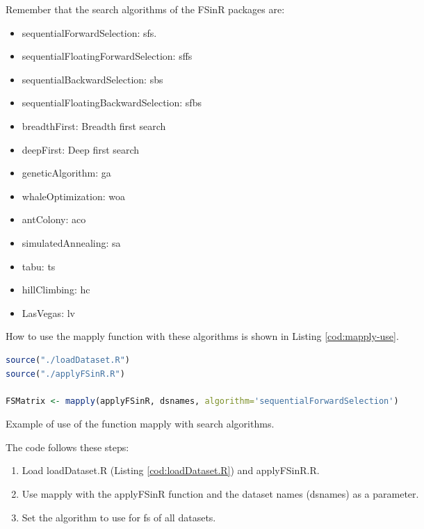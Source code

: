 Remember that the search algorithms of the FSinR packages are:
\begin{itemize}
    \item sequentialForwardSelection: \acrfull{sfs}.
    \item sequentialFloatingForwardSelection: \acrfull{sffs}
    \item sequentialBackwardSelection: \acrfull{sbs}
    \item sequentialFloatingBackwardSelection: \acrfull{sfbs}
    \item breadthFirst: Breadth first search
    \item deepFirst: Deep first search
    \item geneticAlgorithm: \acrfull{ga}
    \item whaleOptimization: \acrfull{woa}
    \item antColony: \acrfull{aco}
    \item simulatedAnnealing: \acrfull{sa}
    \item tabu: \acrfull{ts}
    \item hillClimbing: \acrfull{hc}
    \item LasVegas: \acrfull{lv}
\end{itemize}

How to use the mapply function with these algorithms is shown in Listing \ref{cod:mapply-use}.

\begin{codefloat}[H]
\begin{lstlisting}[language=R, style=Ccolor]
source("./loadDataset.R")
source("./applyFSinR.R")

FSMatrix <- mapply(applyFSinR, dsnames, algorithm='sequentialForwardSelection')
\end{lstlisting}
\caption{Example of use of the function mapply with search algorithms.}
\label{cod:mapply-use}
\end{codefloat}

The code follows these steps:

\begin{enumerate}
    \item Load loadDataset.R (Listing \ref{cod:loadDataset.R}) and applyFSinR.R.
    
    \item Use mapply with the applyFSinR function and the dataset names (dsnames) as a parameter.
    
    \item Set the algorithm to use for \acrshort{fs} of all datasets.
\end{enumerate}

